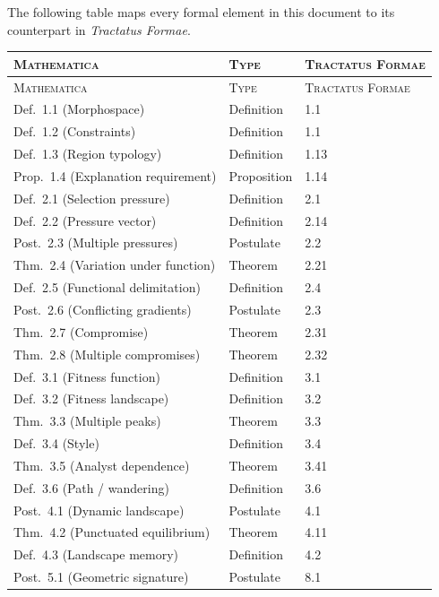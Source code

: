 \documentclass[11pt, a4paper]{article}
\theoremstyle{definition}
\theoremstyle{plain}
\theoremstyle{remark}
\begin{document}
The following table maps every formal element in this document to its
counterpart in \textit{Tractatus Formae}.

\medskip
\begin{longtable}{@{}lll@{}}
\toprule
\textsc{Mathematica} & \textsc{Type} & \textsc{Tractatus Formae} \\
\midrule
\endfirsthead
\toprule
\textsc{Mathematica} & \textsc{Type} & \textsc{Tractatus Formae} \\
\midrule
\endhead
\bottomrule
\endfoot

Def.~1.1 (Morphospace) & Definition & 1.1 \\
Def.~1.2 (Constraints) & Definition & 1.1 \\
Def.~1.3 (Region typology) & Definition & 1.13 \\
Prop.~1.4 (Explanation requirement) & Proposition & 1.14 \\
\addlinespace
Def.~2.1 (Selection pressure) & Definition & 2.1 \\
Def.~2.2 (Pressure vector) & Definition & 2.14 \\
Post.~2.3 (Multiple pressures) & Postulate & 2.2 \\
Thm.~2.4 (Variation under function) & Theorem & 2.21 \\
Def.~2.5 (Functional delimitation) & Definition & 2.4 \\
Post.~2.6 (Conflicting gradients) & Postulate & 2.3 \\
Thm.~2.7 (Compromise) & Theorem & 2.31 \\
Thm.~2.8 (Multiple compromises) & Theorem & 2.32 \\
\addlinespace
Def.~3.1 (Fitness function) & Definition & 3.1 \\
Def.~3.2 (Fitness landscape) & Definition & 3.2 \\
Thm.~3.3 (Multiple peaks) & Theorem & 3.3 \\
Def.~3.4 (Style) & Definition & 3.4 \\
Thm.~3.5 (Analyst dependence) & Theorem & 3.41 \\
Def.~3.6 (Path / wandering) & Definition & 3.6 \\
\addlinespace
Post.~4.1 (Dynamic landscape) & Postulate & 4.1 \\
Thm.~4.2 (Punctuated equilibrium) & Theorem & 4.11 \\
Def.~4.3 (Landscape memory) & Definition & 4.2 \\
\addlinespace
Post.~5.1 (Geometric signature) & Postulate & 8.1 \\

\end{longtable}
\end{document}
